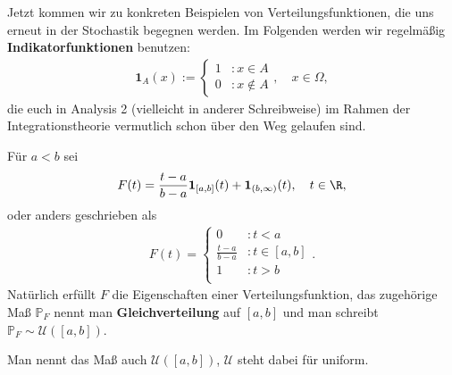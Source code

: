 Jetzt kommen wir zu konkreten Beispielen von Verteilungsfunktionen, die uns erneut in der Stochastik begegnen werden. Im Folgenden werden wir regelm\"a\ss ig \textbf{Indikatorfunktionen} benutzen:
\begin{align*}
	\mathbf 1_{A}(x):=\begin{cases} 
	1&: x\in A\\
	0&: x\notin A
	\end{cases},\quad x\in \Omega,
\end{align*} 
die euch in Analysis 2 (vielleicht in anderer Schreibweise) im Rahmen der Integrationstheorie vermutlich schon \"uber den Weg gelaufen sind.
\begin{beispiel}\label{Gl}
	F\"ur $a<b$ sei \[ F(t) = \frac{t-a}{b-a} \mathbf{1}_{[a,b]}(t) + \mathbf{1}_{(b, \infty)}(t),\quad t\in\R, \] 
	oder anders geschrieben als
	\begin{align*}
		F(t)=
		\begin{cases}
		0&: t<a\\
		\frac{t-a}{b-a}&: t\in [a,b]\\
		1&: t>b\\
		\end{cases}.
	\end{align*}
	Nat\"urlich erf\"ullt $F$ die Eigenschaften einer Verteilungsfunktion, das zugehörige Maß $\mathbb{P}_F$ nennt man \textbf{Gleichverteilung} auf $[a,b]$ und man schreibt $\mathbb{P}_F\sim \mathcal U([a,b])$.
	\begin{center}	
\end{center}
Man nennt das Ma\ss{} auch $\mathcal{U}([a,b])$, $\mathcal U$ steht dabei f\"ur uniform.
\end{beispiel}
